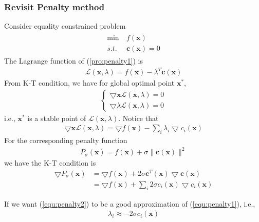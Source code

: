 \subsubsection{Revisit Penalty method}
Consider equality constrained problem
\begin{align}
    \begin{array}{ll}
        \min \ &f(\mathbf{x}) \\
        s.t. \ &\mathbf{c}(\mathbf{x}) = 0
    \end{array}
    \label{pro:penalty1}
\end{align}
The Lagrange function of (\ref{pro:penalty1}) is
\begin{align}
    \mathcal{L}(\mathbf{x}, \lambda) = 
    f(\mathbf{x}) - \lambda^T \mathbf{c}(\mathbf{x})
\end{align}
From K-T condition, we have for global optimal point
$\mathbf{x}^*$,
\begin{align}
    \left\{
        \begin{array}{ll}
            \bigtriangledown{\mathbf{x}} \mathcal{L}
            (\mathbf{x}, \lambda) = 0 \\
            \bigtriangledown{\lambda} \mathcal{L}
            (\mathbf{x}, \lambda) = 0
        \end{array}
        \right.
\end{align}
i.e., $\mathbf{x}^*$ is a stable point of
$\mathcal{L}(\mathbf{x}, \lambda)$.
Notice that
\begin{align}
    \bigtriangledown{\mathbf{x}} \mathcal{L}
    (\mathbf{x}, \lambda) = 
    \bigtriangledown f(\mathbf{x}) - 
    \sum_i \lambda_i \bigtriangledown c_i(\mathbf{x})
    \label{equ:penalty1}
\end{align}
For the corresponding penalty function
\begin{align}
    P_\sigma (\mathbf{x}) =
    f(\mathbf{x}) + \sigma \parallel
    \mathbf{c}(\mathbf{x}) \parallel^2
\end{align}
we have the K-T condition is
\begin{align}
    \bigtriangledown P_\sigma (\mathbf{x}) &= 
    \bigtriangledown f(\mathbf{x}) + 
    2\sigma \mathbf{c}^T(\mathbf{x}) 
    \bigtriangledown \mathbf{c}(\mathbf{x}) \\
    &= 
    \bigtriangledown f(\mathbf{x}) + 
    \sum_i 2\sigma c_i(\mathbf{x}) 
    \bigtriangledown c_i(\mathbf{x})
    \label{equ:penalty2}
\end{align}

If we want (\ref{equ:penalty2}) to be a good
approximation of (\ref{equ:penalty1}), i.e.,
\begin{align}
    \lambda_i \approx - 2 \sigma c_i(\mathbf{x})
\end{align}


